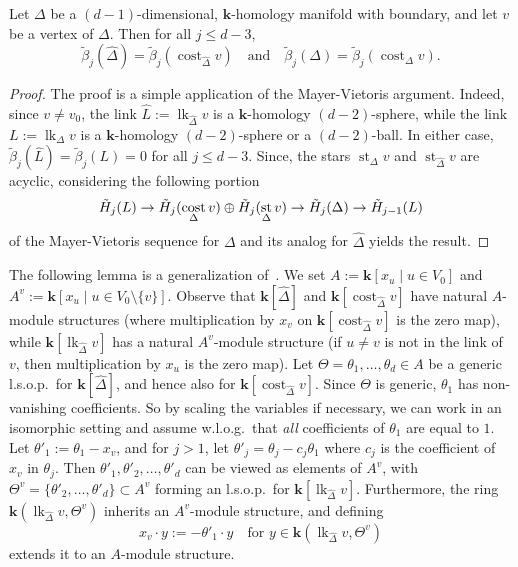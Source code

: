 \documentclass[ALCO,ThmDefs,Unicode,epreuves]{cedram}
\DeclareMathOperator\lk{lk}
\DeclareMathOperator\st{st}
\DeclareMathOperator\cost{cost}
\newcommand{\complet}[1]{\hat{#1}}
\newcommand{\field}{\mathbf{k}}
\begin{document}
\begin{lemma} \label{lem:homol-of-complex-and-costar}
Let $\Delta$ be a $(d-1)$-dimensional, $\field$-homology manifold with boundary, and let $v$ be a vertex of $\Delta$. Then for all $j\leq d-3$,
\[
\tilde{\beta}_j(\complet{\Delta})=\tilde{\beta}_j(\cost_{\complet{\Delta}}v) \quad \mbox{and} \quad \tilde{\beta}_j(\Delta)=\tilde{\beta}_j(\cost_{\Delta}v).
\]
\end{lemma}
\begin{proof}
The proof is a simple application of the Mayer-Vietoris argument. Indeed, since $v\neq v_0$, the link $\complet{L}:=\lk_{\complet{\Delta}}v$ is a $\field$-homology $(d-2)$-sphere, while the link $L:=\lk_\Delta v$ is a $\field$-homology $(d-2)$-sphere or a $(d-2)$-ball. In either case, $\tilde{\beta}_j(\complet{L})=\tilde{\beta}_j(L)=0$ for all $j\leq d-3$. Since, the stars $\st_\Delta v$ and $\st_{\complet{\Delta}}v$ are acyclic, considering the following portion 
\[
\postdisplaypenalty1000000
\tilde{H}_j(L)\to\tilde{H}_j(\cost_\Delta v)\oplus\tilde{H}_j(\st_\Delta v)\to\tilde{H}_j(\Delta)\to\tilde{H}_{j-1}(L)
\]
of the Mayer-Vietoris sequence for $\Delta$ and its analog for $\complet{\Delta}$ yields the result.
\end{proof}

 The following lemma is a generalization of~\cite[Proposition~4.24]{Swartz-09}. We set $A:=\field[x_u \mid u\in V_0]$ and $A^v:=\field[x_u \mid u\in V_0\setminus\{v\}]$.
Observe that $\field[\complet{\Delta}]$ and $\field[\cost_{\complet{\Delta}}v]$ have natural $A$-module structures (where multiplication by $x_v$ on $\field[\cost_{\complet{\Delta}}v]$ is the zero map), while $\field[\lk_{\complet{\Delta}}v]$ has a natural $A^v$-module structure (if $u\neq v$ is not in the link of $v$, then multiplication by $x_u$ is the zero map). Let $\Theta=\theta_1,\ldots,\theta_d\in A$ be a generic l.s.o.p.~for $\field[\complet{\Delta}]$, and hence also for $\field[\cost_{\complet{\Delta}}v]$. Since $\Theta$ is generic, $\theta_1$ has non-vanishing coefficients. So by scaling the variables if necessary, we can work in an isomorphic setting and assume w.l.o.g.~that \emph{all} coefficients of $\theta_1$ are equal to $1$. 
Let $\theta'_1:=\theta_1-x_v$, and for $j>1$, let $\theta'_j=\theta_j-c_j\theta_1$ where $c_j$ is the coefficient of $x_v$ in $\theta_j$. Then $\theta'_1, \theta'_2,\ldots,\theta'_d$ can be viewed as elements of $A^v$, with $\Theta^v=\{\theta'_2,\ldots,\theta'_d\}\subset A^v$ forming an l.s.o.p.~for $\field[\lk_{\complet{\Delta}}v]$. Furthermore, the ring $\field(\lk_{\complet{\Delta}}v, \Theta^v)$ inherits an $A^v$-module structure, and defining
\[
x_v\cdot y:=-\theta'_1\cdot y \quad \mbox{for }y\in \field(\lk_{\complet{\Delta}}v, \Theta^v)
\]
extends it to an $A$-module structure.
\end{document}
